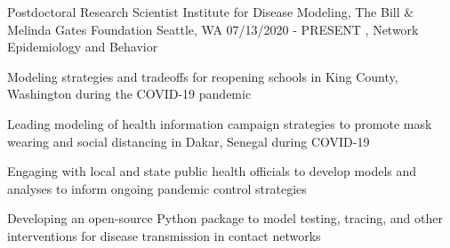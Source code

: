\vspace{-2mm}
\begin{cventries}
  \cventryfour
    {Postdoctoral Research Scientist} %
    {Institute for Disease Modeling, The Bill \& Melinda Gates Foundation} %
    {Seattle, WA} %
    {07/13/2020 - PRESENT} %
    {, Network Epidemiology and Behavior} %
    {
      \begin{cvitems} %
        \item {Modeling strategies and tradeoffs for reopening schools in King County, Washington during the COVID-19 pandemic}
        \item {Leading modeling of health information campaign strategies to promote mask wearing and social distancing in Dakar, Senegal during COVID-19}
        \item {Engaging with local and state public health officials to develop models and analyses to inform ongoing 
        pandemic control strategies}
        \item {Developing an open-source Python package to model testing, tracing, and other interventions for disease transmission in contact networks}

\end{cvitems}}
\end{cventries}
